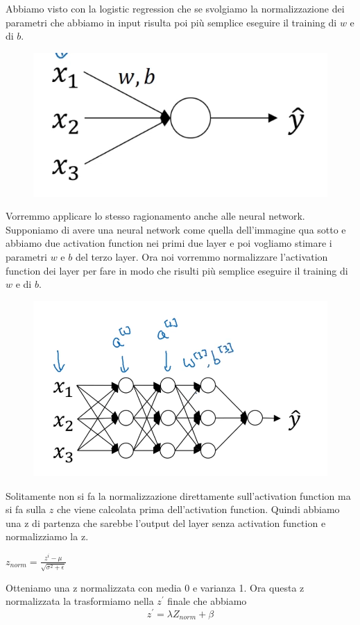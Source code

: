 \documentclass[14pt]{extreport}
\begin{document}
Abbiamo visto con la logistic regression che se svolgiamo la normalizzazione dei parametri che abbiamo in input risulta poi più semplice eseguire il
training di $w$ e di $b$.

\begin{figure}[H]
	\centering
	\includegraphics[width=0.7\linewidth]{568.jpeg}
\end{figure}

Vorremmo applicare lo stesso ragionamento anche alle neural network. Supponiamo di avere una neural network come quella dell'immagine qua sotto e
abbiamo due activation function nei primi due layer e poi vogliamo stimare i parametri $w$ e $b$ del terzo layer. Ora noi vorremmo normalizzare
l'activation function dei layer per fare in modo che risulti più semplice eseguire il training di $w$ e di $b$.

\begin{figure}[H]
	\centering
	\includegraphics[width=0.7\linewidth]{569.jpeg}
\end{figure}

Solitamente non si fa la normalizzazione direttamente sull'activation function ma si fa sulla $z$ che viene calcolata prima dell'activation function.
Quindi abbiamo una z di partenza che sarebbe l'output del layer senza activation function e normalizziamo la z.

$z_{norm} = \frac{z^{i} - \mu}{\sqrt{\sigma^2 + \epsilon }}$

Otteniamo una z normalizzata con media 0 e varianza 1. Ora questa z normalizzata la trasformiamo nella $z^{'}$ finale che abbiamo
$$z^{'} = \lambda Z_{norm} + \beta$$
\end{document}
